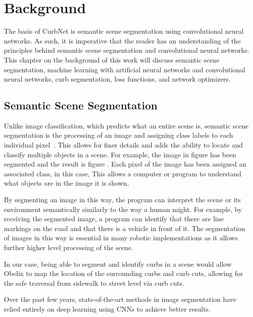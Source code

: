 \chapter{Background}\label{chap:background}
The basis of CurbNet is semantic scene segmentation using convolutional neural networks.
As such, it is imperative that the reader has an understanding of the principles behind semantic scene segmentation and convolutional neural networks.
This chapter on the background of this work will discuss semantic scene segmentation, machine learning with artificial neural networks and convolutional neural networks, curb segmentation, loss functions, and network optimizers.

\section{Semantic Scene Segmentation}\label{section:background-segmentation}
Unlike image classification, which predicts what an entire scene is, semantic scene segmentation is the processing of an image and assigning class labels to each individual pixel~\cite{segmentation-medium}.
This allows for finer details and adds the ability to locate and classify multiple objects in a scene.
For example, the image in figure  has been segmented and the result is figure .
Each pixel of the image has been assigned an associated class, in this case, 
This allows a computer or program to understand what objects are in the image it is shown.

By segmenting an image in this way, the program can interpret the scene or its environment semantically similarly to the way a human might.
For example, by receiving the segmented image, a program can identify that there are line markings on the road and that there is a vehicle in front of it.
The segmentation of images in this way is essential in many robotic implementations as it allows further higher level processing of the scene.

In our case, being able to segment and identify curbs in a scene would allow Obelix to map the location of the surrounding curbs and curb cuts, allowing for the safe traversal from sidewalk to street level via curb cuts.

Over the past few years, state-of-the-art methods in image segmentation have relied entirely on deep learning using CNNs to achieve better results.




